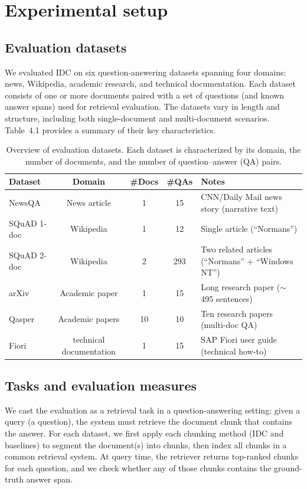 \documentclass[12pt,a4paper]{report}
\begin{document}
\chapter{Experimental setup}

\section{Evaluation datasets}

We evaluated IDC on six question-answering datasets spanning four domains: news, Wikipedia, academic research, and technical documentation. Each dataset consists of one or more documents paired with a set of questions (and known answer spans) used for retrieval evaluation. The datasets vary in length and structure, including both single-document and multi-document scenarios. Table~4.1 provides a summary of their key characteristics.

\begin{table}[h!]
\centering
\caption{Overview of evaluation datasets. Each dataset is characterized by its domain, the number of documents, and the number of question--answer (QA) pairs.}
\small
\begin{tabularx}{\textwidth}{l c c c >{\raggedright\arraybackslash}X}
\hline
\textbf{Dataset} & \textbf{Domain} & \textbf{\#Docs} & \textbf{\#QAs} & \textbf{Notes} \\
\hline
NewsQA & News article & 1 & 15 & CNN/Daily Mail news story (narrative text) \\
SQuAD 1-doc & Wikipedia & 1 & 12 & Single article (``Normans'') \\
SQuAD 2-doc & Wikipedia & 2 & 293 & Two related articles (``Normans'' + ``Windows NT'') \\
arXiv & Academic paper & 1 & 15 & Long research paper ($\sim$495 sentences) \\
Qasper & Academic papers & 10 & 10 & Ten research papers (multi-doc QA) \\
Fiori & technical documentation & 1 & 15 & SAP Fiori user guide (technical how-to) \\
\hline
\end{tabularx}
\end{table}

\section{Tasks and evaluation measures}

We cast the evaluation as a retrieval task in a question-answering setting: given a query (a question), the system must retrieve the document chunk that contains the answer. For each dataset, we first apply each chunking method (IDC and baselines) to segment the document(s) into chunks, then index all chunks in a common retrieval system. At query time, the retriever returns top-ranked chunks for each question, and we check whether any of those chunks contains the ground-truth answer span.
\end{document}
